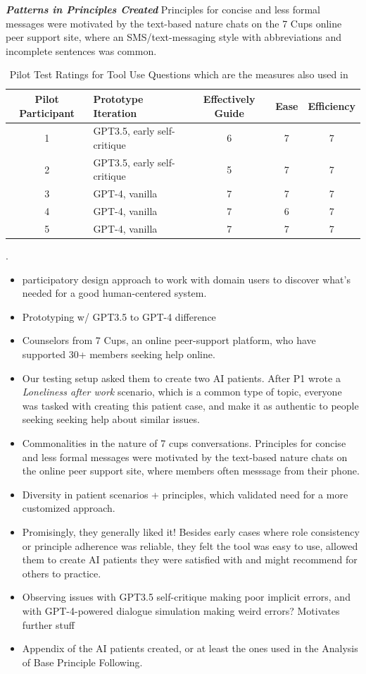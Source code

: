 \documentclass[11pt]{article}
\begin{document}
\textbf{\textit{Patterns in Principles Created}} Principles for concise and less formal messages were motivated by the text-based nature chats on the 7 Cups online peer support site, where an SMS/text-messaging style with abbreviations and incomplete sentences was common.
\begin{table}
    \small
    \centering
    \begin{tabular}{c|l|c|c|c}
         Pilot Participant &Prototype Iteration&  Effectively Guide&  Ease&  Efficiency\\ \hline
         1&GPT3.5, early self-critique&  6&  7&  7\\
         2&GPT3.5, early self-critique&  5&  7&  7\\
         3&GPT-4, vanilla&  7&  7&  7\\
         4&GPT-4, vanilla&  7&  6&  7\\
         5&GPT-4, vanilla& 7& 7& 7\\
    \end{tabular}
    \caption{Pilot Test Ratings for Tool Use Questions which are the measures also used in ~\cite{petridis2023constitutionmaker}}.
    \label{tab:tooluse-formative}
\end{table}

\begin{itemize}
\item participatory design approach to work with domain 
users to discover what’s needed for a good human-centered system.
\item Prototyping w/ GPT3.5 to GPT-4 difference
\item Counselors from 7 Cups, an online peer-support platform, who have supported 30+ members seeking help online.
\item Our testing setup asked them to create two AI patients. After P1 wrote a  \textit{Loneliness after work} scenario, which is a common type of topic, everyone was tasked with creating this patient case, and make it as authentic to people seeking seeking help about similar issues.
\item Commonalities in the nature of 7 cups conversations. Principles for concise and less formal messages were motivated by the text-based nature chats on the online peer support site, where members often messsage from their phone. 
\item Diversity in patient scenarios + principles, which validated need for a more customized approach. 
\item Promisingly, they generally liked it!  Besides early cases where role consistency or principle adherence was reliable, they felt the tool was easy to use, allowed them to create AI patients they were satisfied with and might recommend for others to practice.
\item Observing issues with GPT3.5 self-critique making poor implicit errors, and with GPT-4-powered dialogue simulation making weird errors? Motivates further stuff
\item Appendix of the AI patients created, or at least the ones used in the Analysis of Base Principle Following.
\end{itemize}
\fi
\end{document}
